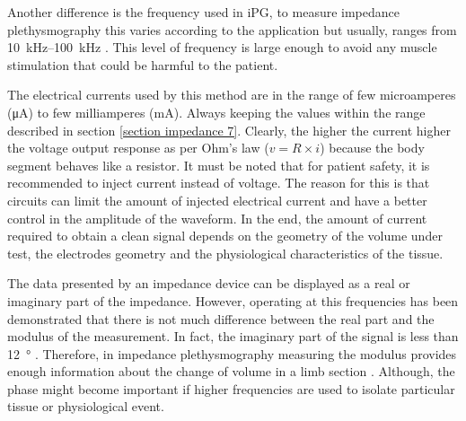 Another difference is the frequency used in iPG, to measure impedance plethysmography this varies according to the application but usually, ranges from \SIrange{10}{100}{\kilo\hertz} . This level of frequency is large enough to avoid any muscle stimulation that could be harmful to the patient. 

The electrical currents used by this method are in the range of few microamperes (\si{\micro\ampere}) to few milliamperes (\si{\milli\ampere}). Always keeping the values within the range described in section \ref{section impedance 7}. Clearly, the higher the current higher the voltage output response as per Ohm's law ($v = R \times i$) because the body segment behaves like a resistor. It must be noted that for patient safety, it is recommended to inject current instead of voltage. The reason for this is that circuits can limit the amount of injected electrical current and have a better control in the amplitude of the waveform. In the end, the amount of current required to obtain a clean signal depends on the geometry of the volume under test, the electrodes geometry and the physiological characteristics of the tissue. 

The data presented by an impedance device can be displayed as a real or imaginary part of the impedance. However, operating at this frequencies has been demonstrated that there is not much difference between the real part and the modulus of the measurement. In fact, the imaginary part of the signal is less than \SI{12}{\degree} \cite{jaffrin1979quantitative}. Therefore, in impedance plethysmography measuring the modulus provides enough information about the change of volume in a limb section \cite{anderson1984impedance}. Although, the phase might become important if higher frequencies are used to isolate particular tissue or physiological event.

